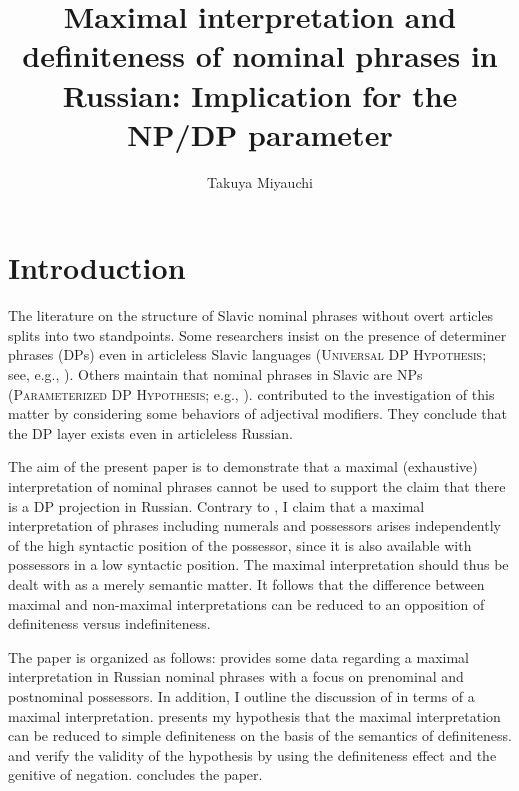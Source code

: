 \documentclass[output=paper,
colorlinks,
citecolor=brown,
newtxmath
]{langscibook}
\title{Maximal interpretation and definiteness of nominal phrases in Russian: Implication for the NP/DP parameter}
\author{%
Takuya Miyauchi\affiliation{The University of Tokyo}\orcid{0000-0003-4836-1617}}
\begin{document}
\maketitle

\section{Introduction}
The literature on the structure of Slavic nominal phrases without overt articles splits into two standpoints. Some researchers insist on the presence of determiner phrases (DPs) even in articleless Slavic languages (\textsc{Universal DP Hypothesis}; see, e.g., \citealt{Progovac1998,Rappaport2002,Rutkowski2002,Basic2004,Franks.Pereltsvaig2004, Pereltsvaig2007a,Rutkowski.Maliszewska2007}). Others maintain that nominal phrases in Slavic are NPs (\textsc{Parameterized DP Hypo\-thesis}; e.g., \citealt{Zlatic1998,Trenkic2004,Boskovic2005,Boskovic2007,Boskovic2009,Despic2013}). \citet{Kagan.Pereltsvaig2012} contributed to the investigation of this matter by considering some behaviors of adjectival modifiers. They conclude that the DP layer exists even in articleless Russian.


The aim of the present paper is to demonstrate that a maximal (exhaustive) interpretation of nominal phrases cannot be used to support the claim that there is a DP projection in Russian. Contrary to \citet{Kagan.Pereltsvaig2012}, I claim that a maximal interpretation of phrases including numerals and possessors arises independently of the high syntactic position of the possessor, since it is also available with possessors in a low syntactic position. The maximal interpretation should thus be dealt with as a merely semantic matter. It follows that the difference between maximal and non-maximal interpretations can be reduced to an opposition of definiteness versus indefiniteness.

The paper is organized as follows:  provides some data regarding a maximal interpretation in Russian nominal phrases with a focus on prenominal and postnominal possessors. In addition, I outline the discussion of \citet{Kagan.Pereltsvaig2012} in terms of a maximal interpretation.  presents my hypothesis that the maximal interpretation can be reduced to simple definiteness on the basis of the semantics of definiteness.  and  verify the validity of the hypothesis by using the definiteness effect and the genitive of negation.  concludes the paper.
\end{document}
